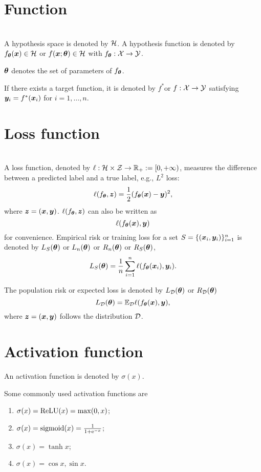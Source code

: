 \documentclass{article}
\begin{document}
\section{Function}~\\
A hypothesis space is denoted by $\mathcal{H}$. A hypothesis function is denoted by $f_{\bm{\theta}}(\bm{x})\in\mathcal{H}$ or $f(\bm{x};\bm{\theta})\in\mathcal{H}$ with $f_{\bm{\theta}}:\mathcal{X}\to\mathcal{Y}$.

$\bm{\theta}$  denotes the set of parameters of  $f_{\bm{\theta}}$.

If there exists a target function, it is denoted by $f^*$or $f:\mathcal{X}\to\mathcal{Y}$ satisfying $\bm{y}_i=f^*(\bm{x}_i)$ for $i=1,\ldots,n$.

\section{Loss function}~\\
A loss function, denoted by $\ell:\mathcal{H}\times\mathcal{Z}\to\mathbb{R}_+:=[0,+\infty)$, measures the difference between a predicted label and a true label, e.g., $L^2$ loss:
\[
    \ell(f_{\bm{\theta}},\bm{z})=\frac{1}{2}(f_{\bm{\theta}}(\bm{x})-\bm{y})^2,
\]
where $\bm{z}=(\bm{x},\bm{y})$. $\ell(f_{\bm{\theta}},\bm{z})$ can also be written as
\[
    \ell(f_{\bm{\theta}}(\bm{x}),\bm{y})
\]
for convenience.
Empirical risk or training loss for a set $S=\{(\bm{x}_i,\bm{y}_i)\}_{i=1}^{n}$ is denoted by   $L_S(\bm{\theta})$ or $L_{n}(\bm{\theta})$ or $R_{n}(\bm{\theta})$ or $R_{S}(\bm{\theta})$,
\begin{equation}
    L_S(\bm{\theta}) =\frac{1}{n}\sum_{i=1}^n\ell(f_{\bm{\theta}}(\bm{x}_i),\bm{y}_i).
\end{equation}


The population risk or expected loss is denoted by $L_{\mathcal{D}}(\bm{\theta})$ or $R_{\mathcal{D}}(\bm{\theta})$
\begin{equation}
    L_{\mathcal{D}}(\bm{\theta}) =\mathbb{E}_{\mathcal{D}}\ell(f_{\bm{\theta}}(\bm{x}),\bm{y}),
\end{equation}
where $\bm{z}=(\bm{x},\bm{y})$ follows the distribution $\mathcal{D}$.

\section{Activation function}
An activation function is denoted by $\sigma(x)$.
\begin{exam}Some commonly used activation functions are~\\
    \begin{enumerate}
        \item $\sigma(x) = \mathrm{ReLU} (x) = \max (0, x)$;
        \item $\sigma(x) ={\rm sigmoid}(x)= \frac{1}{1 + \mathrm{e}^{-x}}$;
        \item $\sigma(x) = \tanh x$;
        \item $\sigma(x) = \cos x, \sin x$.
    \end{enumerate}
\end{exam}
\end{document}
